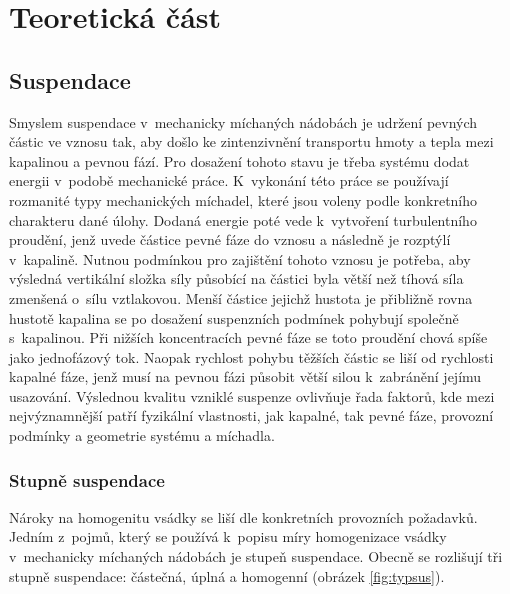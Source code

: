 \chapter{Teoretická část}
\section{Suspendace}
Smyslem suspendace v~mechanicky míchaných nádobách je udržení pevných částic ve vznosu tak, aby došlo ke zintenzivnění transportu hmoty a tepla mezi kapalinou a pevnou fází. Pro dosažení tohoto stavu je třeba systému dodat energii v~podobě mechanické práce. K~vykonání této práce se používají rozmanité typy mechanických míchadel, které jsou voleny podle konkretního charakteru dané úlohy. Dodaná energie poté vede k~vytvoření turbulentního proudění, jenž uvede částice pevné fáze do vznosu a následně je rozptýlí v~kapalině. Nutnou podmínkou pro zajištění tohoto vznosu je potřeba, aby výsledná vertikální složka síly působící na částici byla větší než tíhová síla zmenšená o~sílu vztlakovou. Menší částice jejichž hustota je přibližně rovna hustotě kapalina se po dosažení suspenzních podmínek pohybují společně s~kapalinou. Při nižších koncentracích pevné fáze se toto proudění chová spíše jako jednofázový tok. Naopak rychlost pohybu těžších částic se liší od rychlosti kapalné fáze, jenž musí na pevnou fázi působit větší silou k~zabránění jejímu usazování. Výslednou kvalitu vzniklé suspenze ovlivňuje řada faktorů, kde mezi nejvýznamnější patří fyzikální vlastnosti, jak kapalné, tak pevné fáze, provozní podmínky a geometrie systému a míchadla.

\subsection{Stupně suspendace}
Nároky na homogenitu vsádky se liší dle konkretních provozních požadavků. Jedním z~pojmů, který se používá k~popisu míry homogenizace vsádky v~mechanicky míchaných nádobách je stupeň suspendace. Obecně se rozlišují tři stupně suspendace: částečná, úplná a homogenní (obrázek \ref{fig:typsus}). 
  

